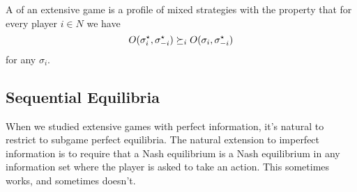 \documentclass[10pt]{article}
\begin{document}
\begin{definition}
	A  of an extensive game is a profile of mixed strategies with the property that for every player $i \in N$ we have\[O(\sigma_i^\star,\sigma_{-i}^\star) \succeq_i O(\sigma_i,\sigma_{-i}^\star)\]for any $\sigma_i$.
\end{definition}







\subsection{Sequential Equilibria}


When we studied extensive games with perfect information, it's natural to restrict to subgame perfect equilibria. The natural extension to imperfect information is to require that a Nash equilibrium is a Nash equilibrium in any information set where the player is asked to take an action. This sometimes works, and sometimes doesn't.
\end{document}
